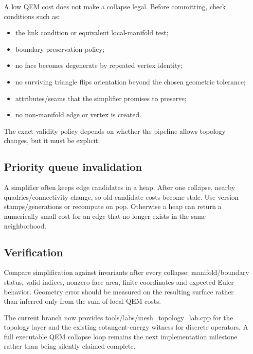 A low QEM cost does not make a collapse legal. Before committing, check conditions such as:

\begin{itemize}
\tightlist
\item
  the link condition or equivalent local-manifold test;
\item
  boundary preservation policy;
\item
  no face becomes degenerate by repeated vertex identity;
\item
  no surviving triangle flips orientation beyond the chosen geometric tolerance;
\item
  attributes/seams that the simplifier promises to preserve;
\item
  no non-manifold edge or vertex is created.
\end{itemize}

The exact validity policy depends on whether the pipeline allows topology changes, but it must be explicit.

\subsection{Priority queue invalidation}\label{appendix-89db9fe1bc8a-priority-queue-invalidation}

A simplifier often keeps edge candidates in a heap. After one collapse, nearby quadrics/connectivity change, so old candidate costs become stale. Use version stamps/generations or recompute on pop. Otherwise a heap can return a numerically small cost for an edge that no longer exists in the same neighborhood.

\subsection{Verification}\label{appendix-89db9fe1bc8a-verification}

Compare simplification against invariants after every collapse: manifold/boundary status, valid indices, nonzero face area, finite coordinates and expected Euler behavior. Geometry error should be measured on the resulting surface rather than inferred only from the sum of local QEM costs.

The current branch now provides tools/labs/mesh\_topology\_lab.cpp for the topology layer and the existing cotangent-energy witness for discrete operators. A full executable QEM collapse loop remains the next implementation milestone rather than being silently claimed complete.

